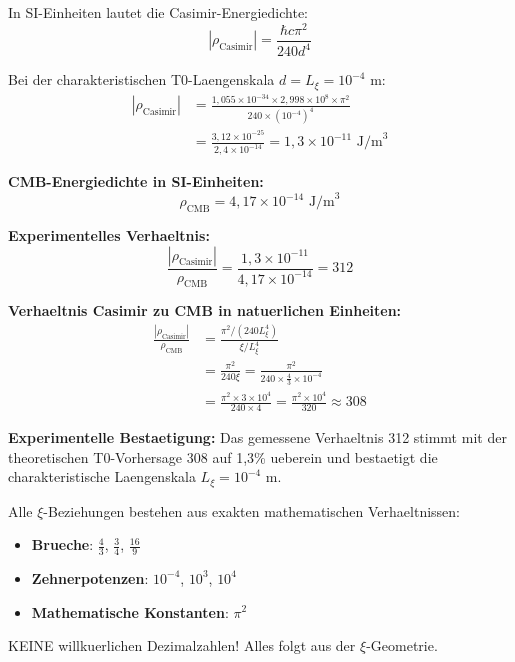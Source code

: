 \documentclass[12pt,a4paper]{article}
\begin{document}
	In SI-Einheiten lautet die Casimir-Energiedichte:
	\begin{equation}
		|\rho_{\text{Casimir}}| = \frac{\hbar c \pi^2}{240 d^4}
	\end{equation}
	
	Bei der charakteristischen T0-Laengenskala $d = L_\xi = 10^{-4}$ m:
	\begin{align}
		|\rho_{\text{Casimir}}| &= \frac{1{,}055 \times 10^{-34} \times 2{,}998 \times 10^8 \times \pi^2}{240 \times (10^{-4})^4} \\
		&= \frac{3{,}12 \times 10^{-25}}{2{,}4 \times 10^{-14}} = 1{,}3 \times 10^{-11} \text{ J/m}^3
	\end{align}
	
	\textbf{CMB-Energiedichte in SI-Einheiten:}
	\begin{equation}
		\rho_{\text{CMB}} = 4{,}17 \times 10^{-14} \text{ J/m}^3
	\end{equation}
	
	\textbf{Experimentelles Verhaeltnis:}
	\begin{equation}
		\frac{|\rho_{\text{Casimir}}|}{\rho_{\text{CMB}}} = \frac{1{,}3 \times 10^{-11}}{4{,}17 \times 10^{-14}} = 312
	\end{equation}
	
	\textbf{Verhaeltnis Casimir zu CMB in natuerlichen Einheiten:}
	\begin{align}
		\frac{|\rho_{\text{Casimir}}|}{\rho_{\text{CMB}}} &= \frac{\pi^2 / (240 L_\xi^4)}{\xi / L_\xi^4} \\
		&= \frac{\pi^2}{240 \xi} = \frac{\pi^2}{240 \times \frac{4}{3} \times 10^{-4}} \\
		&= \frac{\pi^2 \times 3 \times 10^4}{240 \times 4} = \frac{\pi^2 \times 10^4}{320} \approx 308
	\end{align}
	
	\textbf{Experimentelle Bestaetigung:} Das gemessene Verhaeltnis 312 stimmt mit der theoretischen T0-Vorhersage 308 auf 1{,}3\% ueberein und bestaetigt die charakteristische Laengenskala $L_\xi = 10^{-4}$ m.
	
	\begin{important}
		Alle $\xi$-Beziehungen bestehen aus exakten mathematischen Verhaeltnissen:
		\begin{itemize}
			\item \textbf{Brueche}: $\frac{4}{3}$, $\frac{3}{4}$, $\frac{16}{9}$
			\item \textbf{Zehnerpotenzen}: $10^{-4}$, $10^3$, $10^4$
			\item \textbf{Mathematische Konstanten}: $\pi^2$
		\end{itemize}
		KEINE willkuerlichen Dezimalzahlen! Alles folgt aus der $\xi$-Geometrie.
	\end{important}
\end{document}
